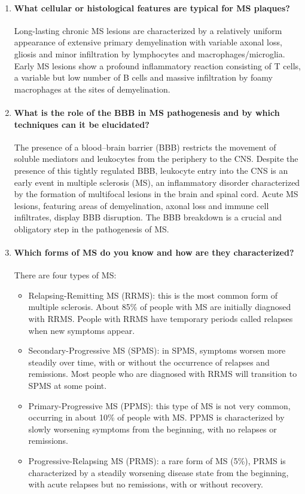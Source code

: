 \documentclass[12pt,article,oneside,a4paper]{memoir}
\begin{document}
\begin{enumerate}
\item \paragraph{What cellular or histological features are typical for MS
plaques?}

Long-lasting chronic MS lesions are characterized by a relatively uniform
appearance of extensive primary demyelination with variable axonal loss,
gliosis and minor infiltration by lymphocytes and macrophages/microglia. Early
MS lesions show a profound inflammatory reaction consisting of T cells, a
variable but low number of B cells and massive infiltration by foamy
macrophages at the sites of demyelination.

\item \paragraph{What is the role of the BBB in MS pathogenesis and by which
techniques can it be elucidated?}

The presence of a blood–brain barrier (BBB) restricts the movement of soluble
mediators and leukocytes from the periphery to the CNS. Despite the presence of
this tightly regulated BBB, leukocyte entry into the CNS is an early event in
multiple sclerosis (MS), an inflammatory disorder characterized by the
formation of multifocal lesions in the brain and spinal cord. Acute MS lesions,
featuring areas of demyelination, axonal loss and immune cell infiltrates,
display BBB disruption. The BBB breakdown is a crucial and obligatory step in 
the pathogenesis of MS.

\item \paragraph{Which forms of MS do you know and how are they characterized?}
There are four types of MS:
\begin{itemize}
\item Relapsing-Remitting MS (RRMS): this is the most common form of multiple
sclerosis. About 85\% of people with MS are initially diagnosed with RRMS.
People with RRMS have temporary periods called relapses when new symptoms
appear.
\item Secondary-Progressive MS (SPMS): in SPMS, symptoms worsen more steadily
over time, with or without the occurrence of relapses and remissions. Most
people who are diagnosed with RRMS will transition to SPMS at some point.
\item Primary-Progressive MS (PPMS): this type of MS is not very common,
occurring in about 10\% of people with MS. PPMS is characterized by slowly
worsening symptoms from the beginning, with no relapses or remissions.
\item Progressive-Relapsing MS (PRMS): a rare form of MS (5\%), PRMS is
characterized by a steadily worsening disease state from the beginning, with
acute relapses but no remissions, with or without recovery.
\end{itemize}


\end{enumerate}
\end{document}
